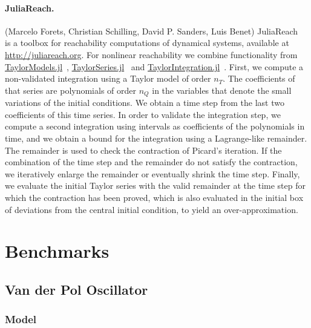 \documentclass[EPiC]{easychair}
\begin{document}
\paragraph{JuliaReach.} (Marcelo Forets, Christian Schilling, David P. Sanders, Luis Benet) JuliaReach~\cite{BogomolovFFPS19} is a toolbox for reachability computations of dynamical systems, available at \url{http://juliareach.org}. For nonlinear reachability we combine functionality from \href{https://github.com/JuliaIntervals/TaylorModels.jl}{TaylorModels.jl}~\cite{TaylorModels.jl}, \href{https://github.com/JuliaDiff/TaylorSeries.jl}{TaylorSeries.jl}~\cite{TaylorSeries.jl} and \href{https://github.com/PerezHz/TaylorIntegration.jl/issues}{TaylorIntegration.jl}~\cite{TaylorIntegration.jl}. First, we compute a non-validated integration using a Taylor model of order $n_T$. The coefficients of that series are polynomials of order $n_Q$ in the variables that denote the small variations of the initial conditions. We obtain a time step from the last two coefficients of this time series. In order to validate the integration step, we compute a second integration using intervals as coefficients of the polynomials in time, and we obtain a bound for the integration using a Lagrange-like remainder. The remainder is used to check the contraction of Picard's iteration. If the combination of the time step and the remainder do not satisfy the contraction, we iteratively enlarge the remainder or eventually shrink the time step. Finally, we evaluate the initial Taylor series with the valid remainder at the time step for which the contraction has been proved, which is also evaluated in the initial box of deviations from the central initial condition, to yield an over-approximation.

\newpage

\section{Benchmarks}
\label{sect:benchmarks}

\subsection{Van der Pol Oscillator}

\subsubsection{Model}
\end{document}

